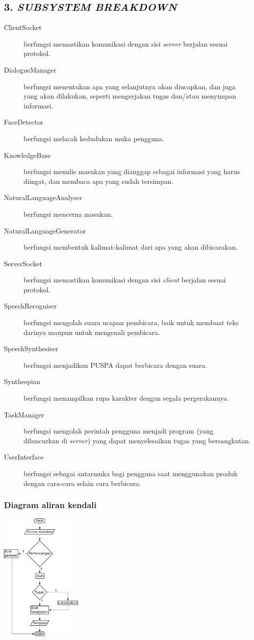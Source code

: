 \subsection*{\textcolor{subsectioncolor}{\textsf{3. \textit{SUBSYSTEM BREAKDOWN}}}}

\begin{description}
\item[ClientSocket] berfungsi memastikan komunikasi dengan sisi \textit{server} berjalan sesuai protokol.
\item[DialogueManager] berfungsi menentukan apa yang selanjutnya akan diucapkan, dan juga yang akan dilakukan, seperti mengerjakan tugas dan/atau menyimpan informasi.
\item[FaceDetector] berfungsi melacak kedudukan muka pengguna.
\item[KnowledgeBase] berfungsi menulis masukan yang dianggap sebagai informasi yang harus diingat, dan membaca apa yang sudah tersimpan.
\item[NaturalLanguageAnalyser] berfungsi mencerna masukan.
\item[NaturalLanguageGenerator] berfungsi membentuk kalimat-kalimat dari apa yang akan dibicarakan.
\item[ServerSocket] berfungsi memastikan komunikasi dengan sisi \textit{client} berjalan sesuai protokol.
\item[SpeechRecogniser] berfungsi mengolah suara ucapan pembicara, baik untuk membuat teks darinya maupun untuk mengenali pembicara.
\item[SpeechSynthesiser] berfungsi menjadikan PUSPA dapat berbicara dengan suara.
\item[Synthespian] berfungsi menampilkan rupa karakter dengan segala pergerakannya.
\item[TaskManager] berfungsi mengolah perintah pengguna menjadi program (yang diluncurkan di \textit{server}) yang dapat menyelesaikan tugas yang bersangkutan.
\item[UserInterface] berfungsi sebagai antarmuka bagi pengguna saat menggunakan produk dengan cara-cara selain cara berbicara.
\end{description}

\subsubsection*{Diagram aliran kendali}
\includegraphics[width=0.3\textwidth]{DiagramAliranKendali}
